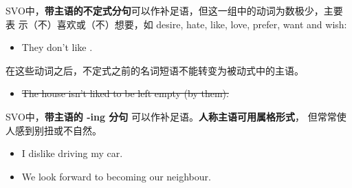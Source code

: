 SVO中，\textbf{带主语的不定式分句}可以作补足语，但这一组中的动词为数极少，主要表
示（不）喜欢或（不）想要，如 desire, hate, like, love, prefer, want and wish:
\begin{itemize}
  \item They don't like .
\end{itemize}在这些动词之后，不定式之前的名词短语不能转变为被动式中的主语。
\begin{itemize}
  \item \sout{The house isn't liked to be left empty (by them).}
\end{itemize}


SVO中，\textbf{带主语的 -ing 分句} 可以作补足语。\textbf{人称主语可用属格形式}，
但常常使人感到别扭或不自然。
\begin{itemize}
  \item I dislike  driving my car.

  \item We look forward to  becoming our neighbour.
\end{itemize}


